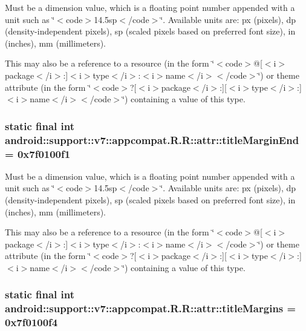 Must be a dimension value, which is a floating point number appended with a unit such as \char`\"{}$<$code$>$14.5sp$<$/code$>$\char`\"{}. Available units are: px (pixels), dp (density-independent pixels), sp (scaled pixels based on preferred font size), in (inches), mm (millimeters). 

This may also be a reference to a resource (in the form \char`\"{}$<$code$>$@\mbox{[}$<$i$>$package$<$/i$>$:\mbox{]}$<$i$>$type$<$/i$>$:$<$i$>$name$<$/i$>$$<$/code$>$\char`\"{}) or theme attribute (in the form \char`\"{}$<$code$>$?\mbox{[}$<$i$>$package$<$/i$>$:\mbox{]}\mbox{[}$<$i$>$type$<$/i$>$:\mbox{]}$<$i$>$name$<$/i$>$$<$/code$>$\char`\"{}) containing a value of this type. \hypertarget{classandroid_1_1support_1_1v7_1_1appcompat_1_1_r_1_1attr_a0c53e6790f3a4fd0b6b8a598b86feac}{
\subsubsection[{titleMarginEnd}]{\setlength{\rightskip}{0pt plus 5cm}static final int android::support::v7::appcompat.R.R::attr::titleMarginEnd = 0x7f0100f1}}
\label{classandroid_1_1support_1_1v7_1_1appcompat_1_1_r_1_1attr_a0c53e6790f3a4fd0b6b8a598b86feac}


Must be a dimension value, which is a floating point number appended with a unit such as \char`\"{}$<$code$>$14.5sp$<$/code$>$\char`\"{}. Available units are: px (pixels), dp (density-independent pixels), sp (scaled pixels based on preferred font size), in (inches), mm (millimeters). 

This may also be a reference to a resource (in the form \char`\"{}$<$code$>$@\mbox{[}$<$i$>$package$<$/i$>$:\mbox{]}$<$i$>$type$<$/i$>$:$<$i$>$name$<$/i$>$$<$/code$>$\char`\"{}) or theme attribute (in the form \char`\"{}$<$code$>$?\mbox{[}$<$i$>$package$<$/i$>$:\mbox{]}\mbox{[}$<$i$>$type$<$/i$>$:\mbox{]}$<$i$>$name$<$/i$>$$<$/code$>$\char`\"{}) containing a value of this type. \hypertarget{classandroid_1_1support_1_1v7_1_1appcompat_1_1_r_1_1attr_de3496ec2c8f2f2fe2b8754c05a7cb72}{
\subsubsection[{titleMargins}]{\setlength{\rightskip}{0pt plus 5cm}static final int android::support::v7::appcompat.R.R::attr::titleMargins = 0x7f0100f4}}
\label{classandroid_1_1support_1_1v7_1_1appcompat_1_1_r_1_1attr_de3496ec2c8f2f2fe2b8754c05a7cb72}


